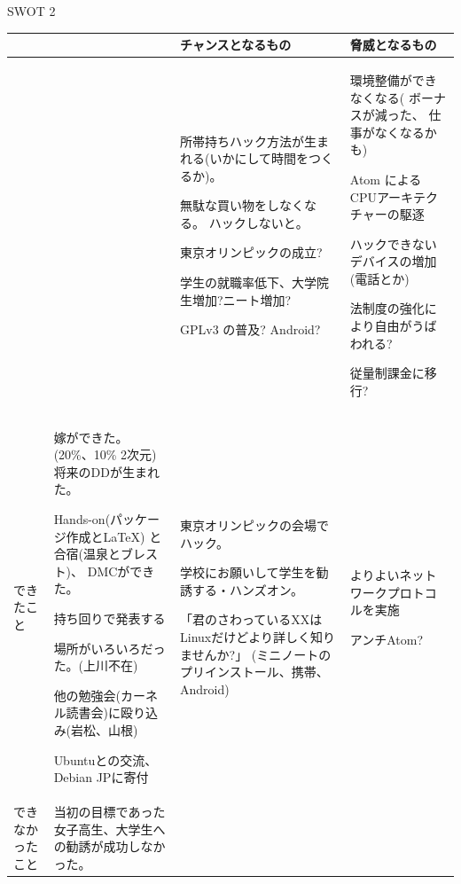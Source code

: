 \begin{frame}{SWOT 2}

{\tiny

\begin{tabular}[t]{|p{1em}|p{16em}|p{12em}|p{12em}|}
\hline
 &  & チャンスとなるもの & 脅威となるもの  \\\hline

 & & 
	 
所帯持ちハック方法が生まれる(いかにして時間をつくるか)。

無駄な買い物をしなくなる。
ハックしないと。

東京オリンピックの成立?

学生の就職率低下、大学院生増加?ニート増加?

GPLv3 の普及?
Android?

&

環境整備ができなくなる(
ボーナスが減った、
仕事がなくなるかも)

Atom によるCPUアーキテクチャーの駆逐

ハックできないデバイスの増加(電話とか)

法制度の強化により自由がうばわれる?

従量制課金に移行?

\\
\hline
できたこと & 

嫁ができた。(20\%、10\% 2次元)
将来のDDが生まれた。

Hands-on(パッケージ作成と\LaTeX{}) と合宿(温泉とブレスト)、
DMCができた。

持ち回りで発表する

場所がいろいろだった。(上川不在)

他の勉強会(カーネル読書会)に殴り込み(岩松、山根)

Ubuntuとの交流、Debian JPに寄付

&

東京オリンピックの会場でハック。

学校にお願いして学生を勧誘する・ハンズオン。

「君のさわっているXXはLinuxだけどより詳しく知りませんか?」
(ミニノートのプリインストール、携帯、Android)

& 

よりよいネットワークプロトコルを実施

アンチAtom?

\\
\hline

できなかったこと
&

当初の目標であった女子高生、大学生への勧誘が成功しなかった。


\end{tabular}}
\end{frame}
